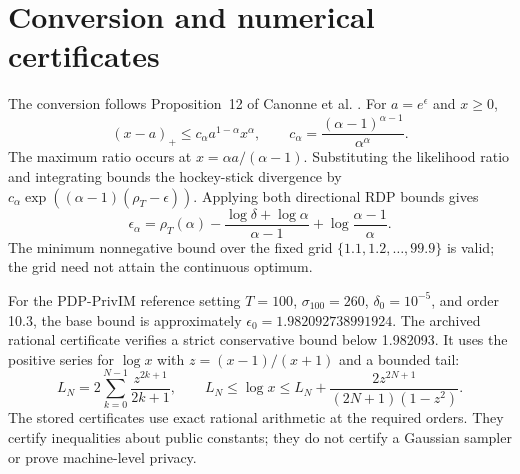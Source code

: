 \section{Conversion and numerical certificates}
The conversion follows Proposition~12 of Canonne et al. \cite{canonne2020}. For $a=e^\epsilon$ and $x\geq0$,
\begin{equation}
 (x-a)_+\leq c_\alpha a^{1-\alpha}x^\alpha,\qquad
 c_\alpha=\frac{(\alpha-1)^{\alpha-1}}{\alpha^\alpha}.
\end{equation}
The maximum ratio occurs at $x=\alpha a/(\alpha-1)$. Substituting the likelihood ratio and integrating bounds the hockey-stick divergence by $c_\alpha\exp((\alpha-1)(\rho_T-\epsilon))$. Applying both directional RDP bounds gives
\begin{equation}
 \epsilon_\alpha=\rho_T(\alpha)
 -\frac{\log\delta+\log\alpha}{\alpha-1}
 +\log\frac{\alpha-1}{\alpha}.\label{eq:conversion}
\end{equation}
The minimum nonnegative bound over the fixed grid $\{1.1,1.2,\ldots,99.9\}$ is valid; the grid need not attain the continuous optimum.

For the PDP-PrivIM reference setting $T=100$, $\sigma_{100}=260$, $\delta_0=10^{-5}$, and order 10.3, the base bound is approximately $\epsilon_0=1.982092738991924$. The archived rational certificate verifies a strict conservative bound below 1.982093. It uses the positive series for $\log x$ with $z=(x-1)/(x+1)$ and a bounded tail:
\begin{equation}
 L_N=2\sum_{k=0}^{N-1}\frac{z^{2k+1}}{2k+1},\qquad
 L_N\leq\log x\leq L_N+\frac{2z^{2N+1}}{(2N+1)(1-z^2)}.
\end{equation}
The stored certificates use exact rational arithmetic at the required orders. They certify inequalities about public constants; they do not certify a Gaussian sampler or prove machine-level privacy.

